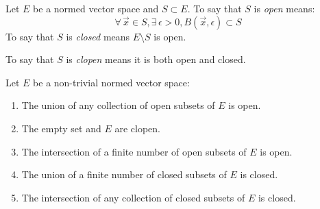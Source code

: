 \documentclass[letterpaper,12pt,fleqn]{article}
\newcommand{\vx}{\vec{x}}
\newcommand{\e}{\epsilon}
\begin{document}
\begin{definition}[Open]
  Let $E$ be a normed vector space and $S\subset E$. To say that $S$ is
  \emph{open} means:
  \[\forall\,\vx\in S,\exists\,\e>0,B(\vx,\e)\subset S\]
  To say that $S$ is \emph{closed} means $E\setminus S$ is open.

  To say that $S$ is \emph{clopen} means it is both open and closed.
\end{definition}

\begin{theorem}
  Let $E$ be a non-trivial normed vector space:
  \begin{enumerate}
  \item The union of any collection of open subsets of $E$ is open.
  \item The empty set and $E$ are clopen.
  \item The intersection of a finite number of open subsets of $E$ is open.
  \item The union of a finite number of closed subsets of $E$ is closed.
  \item The intersection of any collection of closed subsets of $E$ is closed.
  \end{enumerate}
\end{theorem}

\newpage
\end{document}
